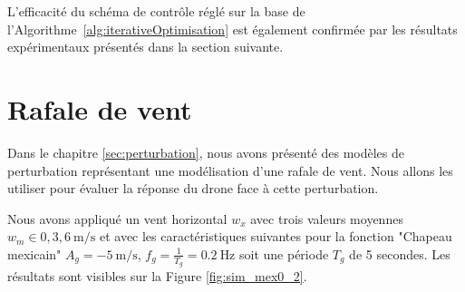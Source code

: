 L'efficacité du schéma de contrôle réglé sur la base de l'Algorithme~\ref{alg:iterativeOptimisation} est également confirmée par les résultats expérimentaux présentés dans la section suivante.

\section{Rafale de vent}

Dans le chapitre \ref{sec:perturbation}, nous avons présenté des modèles de perturbation représentant une modélisation d'une rafale de vent. Nous allons les utiliser pour évaluer la réponse du drone face à cette perturbation. 


Nous avons appliqué un vent horizontal $w_x$ avec trois valeurs moyennes $w_{m} \in {0,3,6}\SI{}{\meter\per\second}$ et avec les caractéristiques suivantes pour la fonction "Chapeau mexicain" $A_g=\SI{-5}{\meter\per\second}$, $f_g = \frac{1}{T_g} = \SI{0.2}{\Hz}$ soit une période $T_g$ de 5 secondes. Les résultats sont visibles sur la Figure \ref{fig:sim_mex0_2}.
